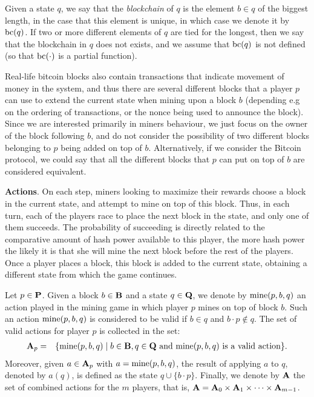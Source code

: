 Given a state $q$, we say that the {\em blockchain} of $q$ is the element $b\in q$ of the biggest length, in the case that this element is unique, in which case we denote it by $\text{bc}(q)$. If two or more different elements of $q$ are tied for the longest, then we say that the blockchain in $q$ does not exists, and we assume that $\text{bc}(q)$ is not defined (so that $\text{bc}(\cdot)$ is a partial function).

Real-life bitcoin blocks also contain transactions that indicate movement of money in the system, and thus there are 
several different blocks that a player $p$ can use to extend the current state when mining upon a block $b$ (depending e.g on the ordering of transactions, or the nonce being used to announce the block). Since we are interested primarily in miners behaviour, we just focus on the owner of the block following $b$, and do not consider the possibility of two different blocks belonging to $p$ being added on top of $b$. Alternatively, if we consider the Bitcoin protocol, we could say that all the different blocks that $p$ can put on top of $b$ are considered equivalent. 

\medskip
\noindent
\textbf{Actions}.
On each step, miners looking to maximize their rewards choose a block in the current state, and attempt to mine on top of this block. Thus, in each turn, each of the players race to place the next block in the state, and only one of them succeeds. The probability of succeeding is directly related to the comparative amount of hash power available to this player, the more hash power the likely it is that she will mine the next block before the rest of the players. Once a player places a block, this block is added to the current state, obtaining a different state from which the game continues.

Let $p \in \mathbf{P}$. Given a block $b \in \mathbf{B}$ and a state $q \in \mathbf{Q}$, we denote by $\text{\rm mine}(p,b,q)$ an action played in the mining game in which player $p$ mines on top of block $b$. Such an action $\text{\rm mine}(p,b,q)$ is considered to be valid if $b \in q$ and $b\cdot p \not\in q$. The set of valid actions for player $p$ is collected in the set:
\begin{eqnarray*}
\mathbf{A}_p & = & \{ \text{\rm mine}(p,b,q) \mid b \in \mathbf{B}, q \in \mathbf{Q} \text{ and }\text{\rm mine}(p,b,q) \text{ is a valid action}\}.
\end{eqnarray*}
Moreover, given $a \in \mathbf{A}_p$ with $a = \text{\rm mine}(p,b,q)$, the result of applying $a$ to $q$, denoted by $a(q)$, is defined as the state $q \cup \{b \cdot p\}$. Finally, we denote by $\mathbf{A}$ the set of combined actions for the $m$ players, that is, $\mathbf{A} = \mathbf{A}_0 \times \mathbf{A}_1 \times \cdots \times \mathbf{A}_{m-1}$.

